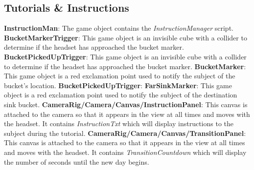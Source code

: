 \documentclass{article}
\begin{document}
\subsection*{Tutorials \& Instructions} %
\textbf{InstructionMan}: The game object contains the \textit{InstructionManager} script.\newline \newline
\textbf{BucketMarkerTrigger}: This game object is an invisible cube with a collider to determine if the headset has approached the bucket marker.\newline \newline
\textbf{BucketPickedUpTrigger}: This game object is an invisible cube with a collider to determine if the headset has approached the bucket marker.\newline \newline
\textbf{BucketMarker}: This game object is a red exclamation point used to notify the subject of the bucket's location.\newline \newline
\textbf{BucketPickedUpTrigger}: %
\textbf{FarSinkMarker}: This game object is a red exclamation point used to notify the subject of the destination sink bucket.\newline \newline
\textbf{CameraRig/Camera/Canvas/InstructionPanel}: This canvas is attached to the camera so that it appears in the view at all times and moves with the headset. It contains \textit{InstructionTxt} which will display instructions to the subject during the tutorial. \newline \newline
\textbf{CameraRig/Camera/Canvas/TransitionPanel}: This canvas is attached to the camera so that it appears in the view at all times and moves with the headset. It contains \textit{TransitionCountdown} which will display the number of seconds until the new day begins. \newline \newline
\end{document}
